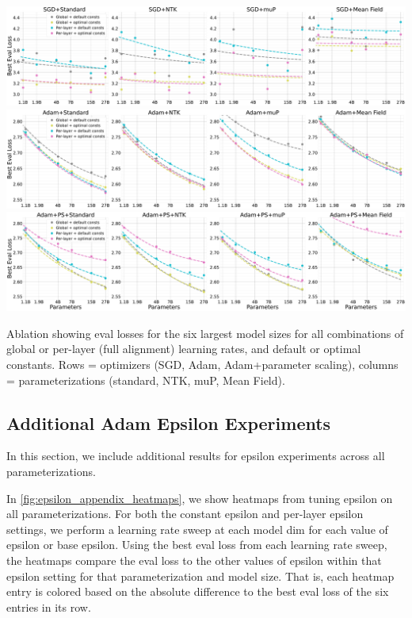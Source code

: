 \documentclass{article}
\theoremstyle{plain}
\theoremstyle{definition}
\theoremstyle{remark}
\begin{document}
\thispagestyle{plain}
\begin{SidewaysFigure}
\includegraphics[width=\linewidth, trim={0, 0, 0, 0},clip]{icml2024/figures/per_layer_lr_appendix/sgd_ablation_appendix_grid.pdf}
\includegraphics[width=\linewidth, trim={0, 0, 0, 0},clip]{icml2024/figures/per_layer_lr_appendix/adamw_ablation_appendix_grid.pdf}
\includegraphics[width=\linewidth, trim={0, 0, 0, 0},clip]{icml2024/figures/per_layer_lr_appendix/adam_ps_ablation_appendix_grid.pdf}
\caption{Ablation showing eval losses for the six largest model sizes for all combinations of global or per-layer (full alignment) learning rates, and default or optimal constants. Rows = optimizers (SGD, Adam, Adam+parameter scaling), columns = parameterizations (standard, NTK, muP, Mean Field).}
\label{fig:app_scaling_ablation}
\end{SidewaysFigure}
\clearpage

\subsection{Additional Adam Epsilon Experiments}

In this section, we include additional results for epsilon experiments across all parameterizations.

In \cref{fig:epsilon_appendix_heatmaps}, we show heatmaps from tuning epsilon on all parameterizations. For both the constant epsilon and per-layer epsilon settings, we perform a learning rate sweep at each model dim for each value of epsilon or base epsilon. Using the best eval loss from each learning rate sweep, the heatmaps compare the eval loss to the other values of epsilon within that epsilon setting for that parameterization and model size. That is, each heatmap entry is colored based on the absolute difference to the best eval loss of the six entries in its row.
\end{document}
